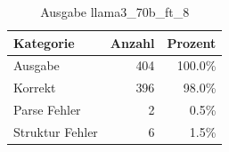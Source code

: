 
\begin{table}[!ht]
\centering
\begin{tabular}{lrr}
\toprule
\textbf{Kategorie} & \textbf{Anzahl} & \textbf{Prozent} \\
\midrule
Ausgabe & 404 & 100.0\% \\
Korrekt & 396 & 98.0\% \\
Parse Fehler & 2 & 0.5\% \\
Struktur Fehler & 6 & 1.5\% \\
\bottomrule
\end{tabular}
\caption{Ausgabe llama3_70b_ft_8}
\label{tab:file_counts}
\end{table}
    